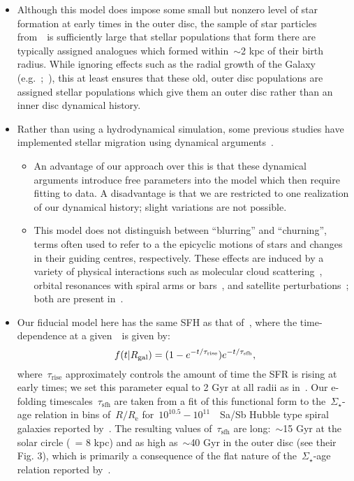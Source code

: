 \documentclass[ms.tex]{subfiles}
\begin{document}
\begin{itemize}
	\item Although this model does impose some small but nonzero level of star 
	formation at early times in the outer disc, the sample of star particles 
	from~\hsim~is sufficiently large that stellar populations that form there 
	are typically assigned analogues which formed within~$\sim$2 kpc of their 
	birth radius. 
	While ignoring effects such as the radial growth of the Galaxy 
	(e.g.~\citealp*{Bird2012};~\citealp{Bird2013}), this at least ensures that 
	these old, outer disc populations are assigned stellar populations which 
	give them an outer disc rather than an inner disc dynamical history. 

	\item Rather than using a hydrodynamical simulation, some previous studies 
	have implemented stellar migration using dynamical 
	arguments~\citep[e.g.][]{Schoenrich2009, Sharma2020}. 
	\begin{itemize} 
		\item An advantage of our approach over this is that these dynamical 
		arguments introduce free parameters into the model which then require 
		fitting to data. 
		A disadvantage is that we are restricted to one realization of our 
		dynamical history; slight variations are not possible. 

		\item This model does not distinguish between ``blurring'' and 
		``churning'', terms often used to refer to a the epicyclic motions of 
		stars and changes in their guiding centres, respectively. 
		These effects are induced by a variety of physical interactions such as 
		molecular cloud scattering~\citep{Mihalas1981, Jenkins1990, 
		Jenkins1992}, orbital resonances with spiral arms or 
		bars~\citep{Sellwood2002, Minchev2011}, and satellite 
		perturbations~\citep{Bird2012}; both are present in~\hsim. 
	\end{itemize} 

	\item Our fiducial model here has the same SFH as that 
	of~\citet{Johnson2021}, where the time-dependence at a given~\rgal~is given 
	by: 
	\begin{equation} 
	f(t|R_\text{gal}) = (1 - e^{-t/\tau_\text{rise}})e^{-t/\tau_\text{sfh}}, 
	\end{equation} 
	where~$\tau_\text{rise}$ approximately controls the amount of time the SFR 
	is rising at early times; we set this parameter equal to 2 Gyr at all 
	radii as in~\citet{Johnson2021}. 
	Our e-folding timescales~$\tau_\text{sfh}$ are taken from a fit of this 
	functional form to the~$\Sigma_\star$-age relation in bins of~$R/R_\text{e}$ 
	for~$10^{10.5} - 10^{11}$~\msun~Sa/Sb Hubble type spiral galaxies reported 
	by~\citet{Sanchez2020}. 
	The resulting values of~$\tau_\text{sfh}$ are long:~$\sim$15 Gyr at the 
	solar circle (\rgal~= 8 kpc) and as high as~$\sim$40 Gyr in the outer disc 
	(see their Fig. 3), which is primarily a consequence of the flat nature 
	of the~$\Sigma_\star$-age relation reported by~\citet{Sanchez2020}. 


\end{itemize}
\end{document}
